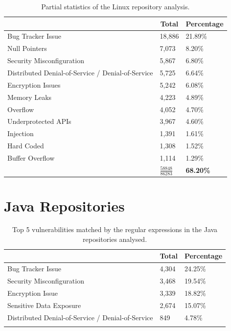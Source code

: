 \documentclass[12pt, a4paper]{report}
\begin{document}
\begin{table}[H]
  \centering
  \begin{tabular}{|l|l|l|}
    \hline \rowcolor[HTML]{D8D8D8}
    \multicolumn{1}{|c|}{Vulnerabilities} & \multicolumn{1}{|c|}{Total} &
    \multicolumn{1}{|c|}{Percentage} \\ \hline
    Bug Tracker Issue & 18,886 & 21.89\% \\
    Null Pointers & 7,073 & 8.20\% \\
    Security Misconfiguration & 5,867 & 6.80\% \\
    Distributed Denial-of-Service / Denial-of-Service & 5,725 & 6.64\% \\
    Encryption Issues & 5,242 & 6.08\% \\
    Memory Leaks & 4,223 & 4.89\% \\
    Overflow & 4,052 & 4.70\% \\
    Underprotected APIs & 3,967 & 4.60\% \\
    Injection & 1,391 & 1.61\% \\
    Hard Coded & 1,308 & 1.52\% \\
    Buffer Overflow & 1,114 & 1.29\% \\ \hline
    & \textbf{$\frac{58848}{86283}$} & \textbf{68.20\%} \\ \hline
  \end{tabular}
  \caption{Partial statistics of the Linux repository analysis.}
  \label{table:case_linux}
\end{table}

\section{Java Repositories}
\begin{longtable}{|l|l|l|}
  \hline \endfirsthead \rowcolor[HTML]{D8D8D8}
  \multicolumn{1}{|c|}{Vulnerabilities} & \multicolumn{1}{|c|}{Total} &
  \multicolumn{1}{|c|}{Percentage} \\ \hline
  Bug Tracker Issue & 4,304 & 24.25\% \\
  Security Misconfiguration & 3,468 & 19.54\% \\
  Encryption Issue & 3,339 & 18.82\% \\
  Sensitive Data Exposure & 2,674 & 15.07\% \\
  Distributed Denial-of-Service / Denial-of-Service & 849 & 4.78\% \\ \hline
  \caption{Top 5 vulnerabilities matched by the regular expressions in the Java repositories
  analysed.}
  \label{table:top5_java}
\end{longtable}
\end{document}
